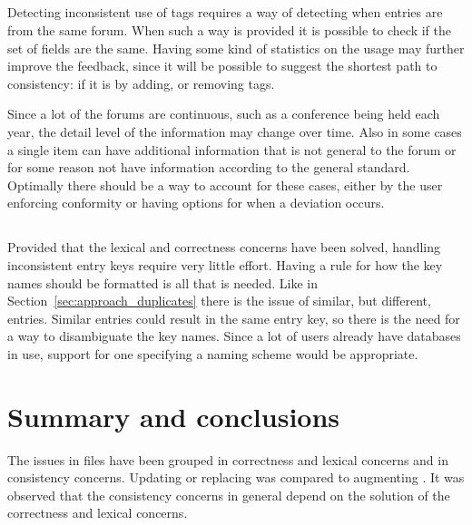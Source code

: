 \subsection{}

Detecting inconsistent use of tags requires a way of detecting when
entries are from the same forum.  When such a way is provided it is
possible to check if the set of fields are the same.  Having some kind
of statistics on the usage may further improve the feedback, since it
will be possible to suggest the shortest path to consistency: if it is
by adding, or removing tags.

Since a lot of the forums are continuous, such as a conference being
held each year, the detail level of the information may change over
time.  Also in some cases a single item can have additional
information that is not general to the forum or for some reason not
have information according to the general standard.  Optimally there
should be a way to account for these cases, either by the user
enforcing conformity or having options for when a deviation occurs.


\subsection{}

Provided that the lexical and correctness concerns have been solved,
handling inconsistent entry keys require very little effort.  Having a
rule for how the key names should be formatted is all that is needed.
Like in Section~\ref{sec:approach_duplicates} there is the issue of
similar, but different, entries.  Similar entries could result in the
same entry key, so there is the need for a way to disambiguate the key
names.  Since a lot of users already have databases in use, support
for one specifying a naming scheme would be appropriate.


\section{Summary and conclusions}

The issues in {\bibtex} files have been grouped in correctness and
lexical concerns and in consistency concerns.  Updating or replacing
{\bibtex} was compared to augmenting {\bibtex}.  It was observed that
the consistency concerns in general depend on the solution of the
correctness and lexical concerns.


